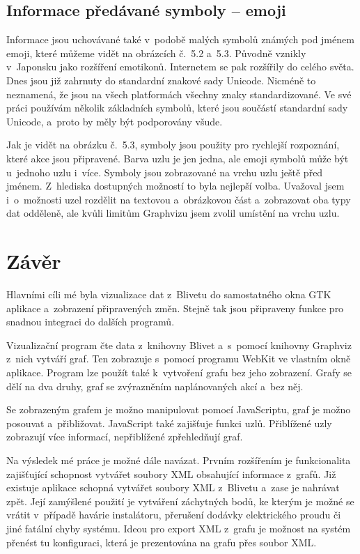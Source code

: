 \documentclass[color,table,oneside,nolot,nolof]{fithesis}
\begin{document}
\section{Informace předávané symboly -- emoji}
  Informace jsou uchovávané také v~podobě malých symbolů známých pod jménem emoji, které můžeme vidět na obrázcích č.~5.2 a~5.3.
	Původně vznikly v~Japonsku jako rozšíření emotikonů. Internetem se pak rozšířily do
	celého světa. Dnes jsou již zahrnuty do standardní znakové sady Unicode\cite{emoji}. Nicméně to neznamená, že jsou na všech platformách všechny znaky standardizované.  Ve své práci používám několik základních symbolů, které 
	jsou součástí standardní sady Unicode, a~proto by měly být podporovány všude.

  Jak je vidět na obrázku č.~5.3, symboly jsou použity pro rychlejší rozpoznání, které akce jsou připravené. Barva uzlu je jen jedna, ale emoji symbolů může být u~jednoho uzlu i~více. Symboly jsou
	zobrazované na vrchu uzlu ještě před jménem. Z~hlediska dostupných možností to byla nejlepší volba. Uvažoval jsem i~o~možnosti uzel rozdělit na textovou a~obrázkovou část a~zobrazovat
	oba typy dat odděleně, ale kvůli limitům Graphvizu jsem zvolil umístění na vrchu uzlu.

\chapter{Závěr}
  Hlavními cíli mé byla vizualizace dat z~Blivetu do samostatného okna GTK aplikace a~zobrazení připravených změn. Stejně tak jsou připraveny funkce pro snadnou integraci
	do dalších programů.   

	Vizualizační program čte data z~knihovny Blivet a~s~pomocí knihovny Graphviz z~nich vytváří graf. Ten zobrazuje s~pomocí programu WebKit ve vlastním okně aplikace. Program lze
	použít také k~vytvoření grafu bez jeho zobrazení. Grafy se dělí na dva druhy, graf se zvýrazněním naplánovaných akcí a~bez něj.

	Se zobrazeným grafem je možno manipulovat pomocí JavaScrip\-tu\cite{javascript}, graf je možno posouvat a~přibližovat. JavaScript také zajišťuje funkci  uzlů. Přiblížené uzly zobrazují
	více informací, nepřiblížené zpřehledňují graf.

	Na výsledek mé práce je možné dále navázat.
	Prvním rozšířením je funkcionalita zajišťující schopnost vytvářet soubory XML obsahující informace z~grafů. 
	Již existuje aplikace schopná vytvářet soubory XML z~Blivetu a~zase je nahrávat zpět. Její zamýšlené
	použití je vytváření záchytných bodů, ke kterým je možné se vrátit v~případě havárie instalátoru, přerušení dodávky elektrického proudu či jiné fatální chyby systému. Ideou pro export
	XML z~grafu je možnost na systém přenést tu konfiguraci, která je prezentována na grafu přes soubor XML.
\end{document}
